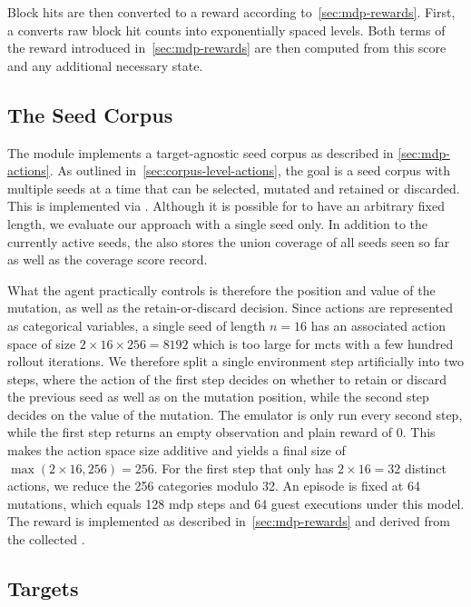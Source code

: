 Block hits are then converted to a reward according to~\cref{sec:mdp-rewards}.
First, a  converts raw block hit counts into exponentially spaced levels.
Both terms of the reward introduced in~\cref{sec:mdp-rewards} are then computed from
this score and any additional necessary state.

\subsection{The Seed Corpus}\label{sec:impl-corpus}

The  module implements a target-agnostic seed corpus as described in \cref{sec:mdp-actions}.
As outlined in~\cref{sec:corpus-level-actions}, the goal is a seed corpus with multiple seeds
at a time that can be selected, mutated and retained or discarded.
This is implemented via .
Although it is possible for  to have an arbitrary fixed length,
we evaluate our approach with a single seed only.
In addition to the currently active seeds, the  also stores the union coverage
of all seeds seen so far as well as the coverage score record.

What the agent practically controls is therefore the position and value of the mutation,
as well as the retain-or-discard decision.
Since actions are represented as categorical variables, a single seed of length $n=16$
has an associated action space of size $2\times 16\times 256=8192$ which is too large
for \gls{mcts} with a few hundred rollout iterations.
We therefore split a single environment step artificially into two steps, where the
action of the first step decides on whether to retain or discard the previous seed as well
as on the mutation position, while the second step decides on the value of the mutation.
The emulator is only run every second step, while the first step returns an empty
observation and plain reward of 0.
This makes the action space size additive and yields a final size of $\max(2\times 16,256)=256$.
For the first step that only has $2\times 16=32$ distinct actions, we reduce the 256 categories
modulo 32.
An episode is fixed at 64 mutations, which equals 128 \gls{mdp} steps and 64 guest
executions under this model.
The reward is implemented as described in~\cref{sec:mdp-rewards} and derived from the
collected .

\subsection{Targets}\label{sec:impl-targets}

